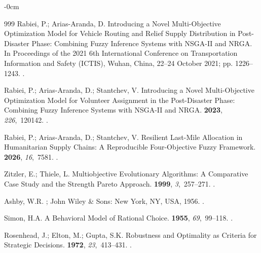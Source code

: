 \documentclass[systems,article,accept,moreauthors,pdftex]{Definitions/mdpi}
\begin{document}
\begin{adjustwidth}{-\extralength}{0cm}
\begin{thebibliography}{999}
Rabiei, P.; Arias-Aranda, D.
\newblock Introducing a Novel Multi-Objective Optimization Model for Vehicle
  Routing and Relief Supply Distribution in Post-Disaster Phase: Combining
  Fuzzy Inference Systems with {NSGA-II} and {NRGA}.
\newblock In Proceedings of the  2021 6th International
  Conference on Transportation Information and Safety (ICTIS), Wuhan, China, 22--24 October
  2021; \linebreak  pp. 1226--1243.
.

Rabiei, P.; Arias-Aranda, D.; Stantchev, V.
\newblock Introducing a Novel Multi-Objective Optimization Model for Volunteer
  Assignment in the Post-Disaster Phase: Combining Fuzzy Inference Systems with
  {NSGA-II} and {NRGA}.
 {\bf 2023}, {\em 226},~120142.
.

Rabiei, P.; Arias-Aranda, D.; Stantchev, V.
\newblock Resilient Last-Mile Allocation in Humanitarian Supply Chains: A
  Reproducible Four-Objective Fuzzy Framework.
 {\bf 2026}, {\em 16},~7581.
.

Zitzler, E.; Thiele, L.
\newblock Multiobjective Evolutionary Algorithms: A Comparative Case Study and
  the Strength {Pareto} Approach.
 {\bf 1999}, {\em
  3},~257--271.
.

Ashby, W.R.
; John Wiley \& Sons: New York,
  NY, USA,  1956.
.

Simon, H.A.
\newblock A Behavioral Model of Rational Choice.
 {\bf 1955}, {\em
  69},~99--118.
.

Rosenhead, J.; Elton, M.; Gupta, S.K.
\newblock Robustness and Optimality as Criteria for Strategic Decisions.
 {\bf 1972}, {\em 23},~413--431.
.


\end{thebibliography}
\end{adjustwidth}
\end{document}
